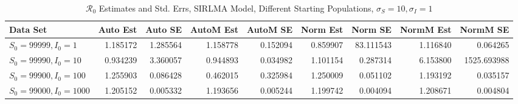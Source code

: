 \documentclass[12pt]{article}
\newcommand{\rr}{\ensuremath{\mathcal{R}_0}}
\begin{document}
\begin{table}[H]
	
	\caption{$\rr$ Estimates and Std. Errs, SIRLMA Model,
		Different Starting Populations, 
		$\sigma_S = 10, \sigma_I = 1$}
	\begin{footnotesize}
		\hskip -1.7cm
	\begin{tabular}{l|r|r|r|r|r|r|r|r}
		\hline
		Data Set & Auto Est & Auto SE & AutoM Est & AutoM SE & Norm Est & Norm SE & NormM Est & NormM SE\\
		\hline
		$S_0 = 99999, I_0 = 1$ & 1.185172 & 1.285564 & 1.158778 & 0.152094 & 0.859907 & 83.111543 & 1.116840 & 0.064265\\
		\hline
		$S_0 = 99990, I_0 = 10$ & 0.934239 & 3.360057 & 0.944893 & 0.034982 & 1.101154 & 0.287314 & 6.153800 & 1525.693988\\
		\hline
		$S_0 = 99900, I_0 = 100$ & 1.255903 & 0.086428 & 0.462015 & 0.325984 & 1.250009 & 0.051102 & 1.193192 & 0.035157\\
		\hline
		$S_0 = 99000, I_0 = 1000$ & 1.205152 & 0.005332 & 1.193656 & 0.005244 & 1.199742 & 0.004094 & 1.208671 & 0.004804\\
		\hline
	\end{tabular}
\end{footnotesize}
\end{table}
\end{document}
